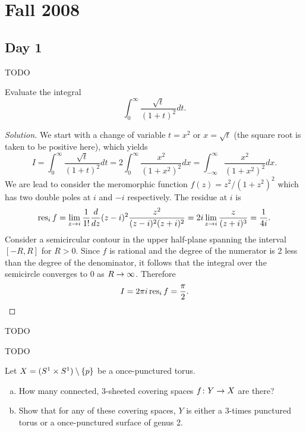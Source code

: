 \section{Fall 2008}
\label{S:fall-2008}

\subsection{Day 1}
\label{S:fall-2008-1}
\mbox{}


TODO


Evaluate the integral
\[
\int_0^\infty \frac{\sqrt{t}}{(1+t)^2} d t.
\]

\begin{proof}[Solution]
  We start with a change of variable $t = x^2$ or $x = \sqrt{t}$ (the square root is taken to be positive here), which yields
  \[
  I =
  \int_0^\infty \frac{\sqrt{t}}{(1+t)^2} d t =
  2 \int_0^\infty \frac{x^2}{(1+x^2)^2} d x =
  \int_{-\infty}^\infty \frac{x^2}{(1+x^2)^2} d x.
  \]
  We are lead to consider the meromorphic function $f(z) = z^2/(1+z^2)^2$ which has two double poles at $i$ and $-i$ respectively. The residue at $i$ is
  \[
  \operatorname{res}_i f =
  \lim_{z \rightarrow i} \frac{1}{1!} \frac{d}{d z} (z-i)^2 \frac{z^2}{(z-i)^2(z+i)^2} =
  2 i \lim_{z \rightarrow i} \frac{z}{(z+i)^3} = \frac{1}{4 i}.
  \]
  Consider a semicircular contour in the upper half-plane spanning the interval $[-R,R]$ for $R > 0$. Since $f$ is rational and the degree of the numerator is 2 less than the degree of the denominator, it follows that the integral over the semicircle converges to $0$ as $R \rightarrow \infty$. Therefore
  \[
  I = 2 \pi i \operatorname{res}_i f = \frac{\pi}{2}. \qedhere
  \]
\end{proof}

TODO


TODO


Let $X = (S^1 \times S^1) \setminus \{p\}$ be a once-punctured torus.
\begin{enumerate}[(a)]
\item How many connected, 3-sheeted covering spaces $f \colon Y \rightarrow X$ are there?
\item Show that for any of these covering spaces, $Y$ is either a 3-times punctured torus or a once-punctured surface of genus 2.
\end{enumerate}

